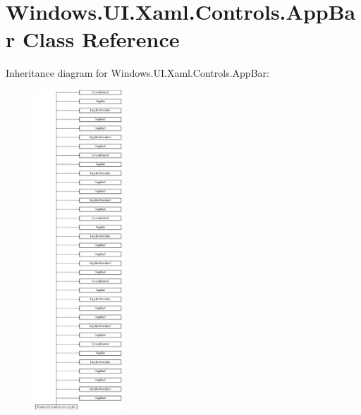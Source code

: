 \hypertarget{class_windows_1_1_u_i_1_1_xaml_1_1_controls_1_1_app_bar}{}\section{Windows.\+U\+I.\+Xaml.\+Controls.\+App\+Bar Class Reference}
\label{class_windows_1_1_u_i_1_1_xaml_1_1_controls_1_1_app_bar}
Inheritance diagram for Windows.\+U\+I.\+Xaml.\+Controls.\+App\+Bar\+:\begin{figure}[H]
\begin{center}
\leavevmode
\includegraphics[height=12.000000cm]{class_windows_1_1_u_i_1_1_xaml_1_1_controls_1_1_app_bar}
\end{center}
\end{figure}

